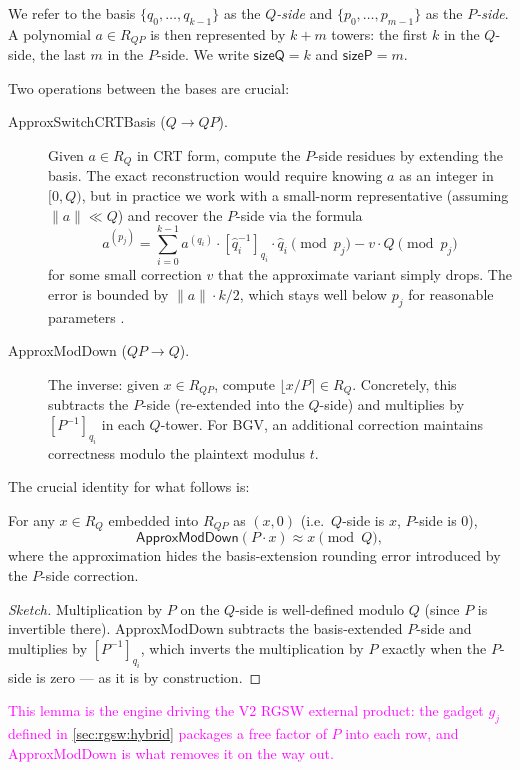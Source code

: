 We refer to the basis $\{q_0, \dots, q_{k-1}\}$ as the \emph{$Q$-side} and $\{p_0, \dots, p_{m-1}\}$ as the \emph{$P$-side}. A polynomial $a \in R_{QP}$ is then represented by $k + m$ towers: the first $k$ in the $Q$-side, the last $m$ in the $P$-side. We write $\mathsf{sizeQ} = k$ and $\mathsf{sizeP} = m$.

Two operations between the bases are crucial:

\begin{description}
    \item[\textsf{ApproxSwitchCRTBasis} ($Q \to QP$).] Given $a \in R_Q$ in CRT form, compute the $P$-side residues by extending the basis. The exact reconstruction would require knowing $a$ as an integer in $[0, Q)$, but in practice we work with a small-norm representative (assuming $\|a\| \ll Q$) and recover the $P$-side via the formula
    \begin{equation}
        \label{eq:basis-ext}
        a^{(p_j)} = \sum_{i=0}^{k-1} a^{(q_i)} \cdot [\hat{q}_i^{-1}]_{q_i} \cdot \hat{q}_i \pmod{p_j} - v \cdot Q \pmod{p_j}
    \end{equation}
    for some small correction $v$ that the approximate variant simply drops. The error is bounded by $\|a\| \cdot k / 2$, which stays well below $p_j$ for reasonable parameters \autocite{halevi2019improved}.

    \item[\textsf{ApproxModDown} ($QP \to Q$).] The inverse: given $x \in R_{QP}$, compute $\lfloor x/P \rceil \in R_Q$. Concretely, this subtracts the $P$-side (re-extended into the $Q$-side) and multiplies by $[P^{-1}]_{q_i}$ in each $Q$-tower. For BGV, an additional correction maintains correctness modulo the plaintext modulus $t$.
\end{description}

The crucial identity for what follows is:

\begin{lemma}[$P$-cancellation]
\label{lem:P-cancel}
For any $x \in R_Q$ embedded into $R_{QP}$ as $(x, 0)$ (i.e.\ $Q$-side is $x$, $P$-side is $0$),
\begin{equation}
    \mathsf{ApproxModDown}(P \cdot x) \approx x \pmod{Q},
\end{equation}
where the approximation hides the basis-extension rounding error introduced by the $P$-side correction.
\end{lemma}

\begin{proof}[Sketch]
Multiplication by $P$ on the $Q$-side is well-defined modulo $Q$ (since $P$ is invertible there). \textsf{ApproxModDown} subtracts the basis-extended $P$-side and multiplies by $[P^{-1}]_{q_i}$, which inverts the multiplication by $P$ exactly when the $P$-side is zero --- as it is by construction.
\end{proof}

\noindent\textcolor{magenta}{This lemma is the engine driving the V2 RGSW external product: the gadget $g_j$ defined in \autoref{sec:rgsw:hybrid} packages a free factor of $P$ into each row, and \textsf{ApproxModDown} is what removes it on the way out.}
\fi